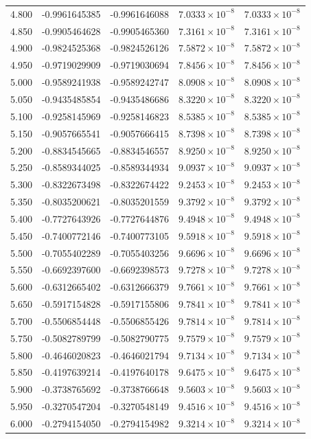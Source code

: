 \documentclass[11pt,a4paper]{article}
\begin{document}
\begin{longtable}{rrrrr}
4.800 & -0.9961645385 & -0.9961646088 & $7.0333\times 10^{-8}$ & $7.0333\times 10^{-8}$ \\
4.850 & -0.9905464628 & -0.9905465360 & $7.3161\times 10^{-8}$ & $7.3161\times 10^{-8}$ \\
4.900 & -0.9824525368 & -0.9824526126 & $7.5872\times 10^{-8}$ & $7.5872\times 10^{-8}$ \\
4.950 & -0.9719029909 & -0.9719030694 & $7.8456\times 10^{-8}$ & $7.8456\times 10^{-8}$ \\
5.000 & -0.9589241938 & -0.9589242747 & $8.0908\times 10^{-8}$ & $8.0908\times 10^{-8}$ \\
5.050 & -0.9435485854 & -0.9435486686 & $8.3220\times 10^{-8}$ & $8.3220\times 10^{-8}$ \\
5.100 & -0.9258145969 & -0.9258146823 & $8.5385\times 10^{-8}$ & $8.5385\times 10^{-8}$ \\
5.150 & -0.9057665541 & -0.9057666415 & $8.7398\times 10^{-8}$ & $8.7398\times 10^{-8}$ \\
5.200 & -0.8834545665 & -0.8834546557 & $8.9250\times 10^{-8}$ & $8.9250\times 10^{-8}$ \\
5.250 & -0.8589344025 & -0.8589344934 & $9.0937\times 10^{-8}$ & $9.0937\times 10^{-8}$ \\
5.300 & -0.8322673498 & -0.8322674422 & $9.2453\times 10^{-8}$ & $9.2453\times 10^{-8}$ \\
5.350 & -0.8035200621 & -0.8035201559 & $9.3792\times 10^{-8}$ & $9.3792\times 10^{-8}$ \\
5.400 & -0.7727643926 & -0.7727644876 & $9.4948\times 10^{-8}$ & $9.4948\times 10^{-8}$ \\
5.450 & -0.7400772146 & -0.7400773105 & $9.5918\times 10^{-8}$ & $9.5918\times 10^{-8}$ \\
5.500 & -0.7055402289 & -0.7055403256 & $9.6696\times 10^{-8}$ & $9.6696\times 10^{-8}$ \\
5.550 & -0.6692397600 & -0.6692398573 & $9.7278\times 10^{-8}$ & $9.7278\times 10^{-8}$ \\
5.600 & -0.6312665402 & -0.6312666379 & $9.7661\times 10^{-8}$ & $9.7661\times 10^{-8}$ \\
5.650 & -0.5917154828 & -0.5917155806 & $9.7841\times 10^{-8}$ & $9.7841\times 10^{-8}$ \\
5.700 & -0.5506854448 & -0.5506855426 & $9.7814\times 10^{-8}$ & $9.7814\times 10^{-8}$ \\
5.750 & -0.5082789799 & -0.5082790775 & $9.7579\times 10^{-8}$ & $9.7579\times 10^{-8}$ \\
5.800 & -0.4646020823 & -0.4646021794 & $9.7134\times 10^{-8}$ & $9.7134\times 10^{-8}$ \\
5.850 & -0.4197639214 & -0.4197640178 & $9.6475\times 10^{-8}$ & $9.6475\times 10^{-8}$ \\
5.900 & -0.3738765692 & -0.3738766648 & $9.5603\times 10^{-8}$ & $9.5603\times 10^{-8}$ \\
5.950 & -0.3270547204 & -0.3270548149 & $9.4516\times 10^{-8}$ & $9.4516\times 10^{-8}$ \\
6.000 & -0.2794154050 & -0.2794154982 & $9.3214\times 10^{-8}$ & $9.3214\times 10^{-8}$ \\
\end{longtable}
\endgroup
\clearpage
\end{document}
